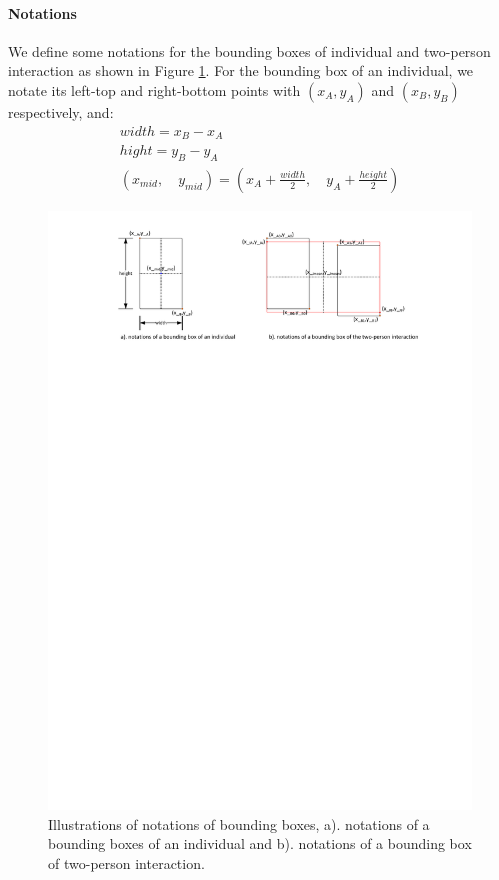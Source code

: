 \paragraph*{Notations}
We define some notations for the bounding boxes of individual and two-person interaction as shown in Figure \ref{fig:bb_notations}. For the bounding box of an individual, we notate its left-top and right-bottom points  with \((x_A,y_A)\) and \((x_B,y_B)\) respectively, and:
\begin{eqnarray}
	width = x_B - x_A \\
	hight = y_B - y_A \\
	(x_{mid}, \quad y_{mid}) = (x_A + \frac{width}{2},\quad y_A + \frac{height}{2})
\end{eqnarray}
\begin{figure}
	\includegraphics[trim=2cm 23cm 0cm 1cm]{fig01/bb_notations.pdf}
	\caption{Illustrations of notations of bounding boxes, a). notations of a bounding boxes of an individual and b). notations of a bounding box of two-person interaction.}
	\label{fig:bb_notations}
\end{figure}
